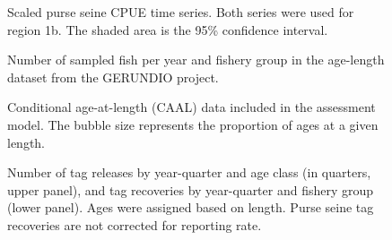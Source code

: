 \documentclass[
]{scrartcl}
\begin{document}
\newpage{}

\begin{figure}


\caption{\label{fig-ts-ps-cpue}Scaled purse seine CPUE time series. Both
series were used for region 1b. The shaded area is the 95\% confidence
interval.}

\end{figure}%

\newpage{}

\begin{figure}


\caption{\label{fig-caal-nsamp}Number of sampled fish per year and
fishery group in the age-length dataset from the GERUNDIO project.}

\end{figure}%

\newpage{}

\begin{figure}


\caption{\label{fig-caal}Conditional age-at-length (CAAL) data included
in the assessment model. The bubble size represents the proportion of
ages at a given length.}

\end{figure}%

\newpage{}

\begin{figure}


\caption{\label{fig-tag-rec}Number of tag releases by year-quarter and
age class (in quarters, upper panel), and tag recoveries by year-quarter
and fishery group (lower panel). Ages were assigned based on length.
Purse seine tag recoveries are not corrected for reporting rate.}

\end{figure}%
\end{document}
